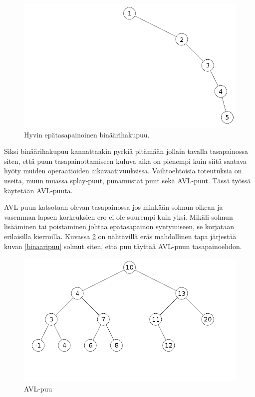 \documentclass[12pt,a4paper,titlepage]{article}
\begin{document}
\begin{figure}
\centering
\includegraphics[width=15cm]{kuvat/binaaripuu-epatasapaino.png}
\caption{Hyvin epätasapainoinen binäärihakupuu.}
\label{epatasapaino}
\end{figure}

Siksi binäärihakupuu kannattaakin pyrkiä pitämään jollain tavalla tasapainossa siten, että puun tasapainottamiseen kuluva aika on pienempi kuin siitä saatava hyöty muiden operaatioiden aikavaativuuksissa. Vaihtoehtoisia toteutuksia on useita, muun muassa splay-puut, punamustat puut sekä AVL-puut. Tässä työssä käytetään AVL-puuta. \cite{cormen}

AVL-puun katsotaan olevan tasapainossa jos minkään solmun oikean ja vasemman lapsen korkeuksien ero ei ole suurempi kuin yksi. Mikäli solmun lisääminen tai poistaminen johtaa epätasapainon syntymiseen, se korjataan erilaisilla kierroilla. Kuvassa \ref{avl} on nähtävillä eräs mahdollinen tapa järjestää kuvan \ref{binaaripuu} solmut siten, että puu täyttää AVL-puun tasapainoehdon. \cite{cormen}

\begin{figure}
\centering
\includegraphics[width=15cm]{kuvat/avlpuu.png}
\caption{AVL-puu}
\label{avl}
\end{figure}
\end{document}
